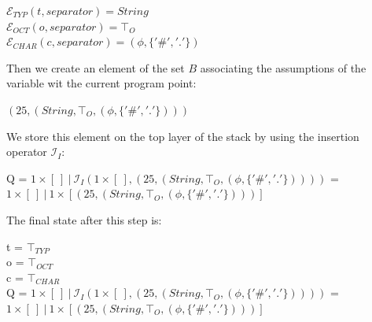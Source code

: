 \documentclass[10pt]{report}
\begin{document}
\begin{enumerate}
	\begin{center}
		$ \mathcal{E}_{TYP} (t, separator) = String $ \\
		$ \mathcal{E}_{OCT} (o, separator) = \top_{O} $ \\
		$ \mathcal{E}_{CHAR}(c, separator) = (\phi, \lbrace '\#', '.' \rbrace) $
	\end{center}
	Then we create an element of the set $ B $ associating the assumptions of the variable wit the current program point:
	\begin{center}
		$ (25, (String, \top_{O}, (\phi, \lbrace '\#', '.' \rbrace))) $
	\end{center}
	We store this element on the top layer of the stack by using the insertion operator $ \mathcal{I}_{I} $:
	\begin{center}
		Q = $ 1 \times [\ ]\ \vert\ \mathcal{I}_{I}(1 \times [\ ], (25, (String, \top_{O}, (\phi, \lbrace '\#', '.' \rbrace))))$ = \\
		$ 1 \times [\ ]\ \vert\ 1 \times [(25, (String, \top_{O}, (\phi, \lbrace '\#', '.' \rbrace)))]$\\
	\end{center}
	
	The final state after this step is: 
	\begin{center}
		t = $ \top_{TYP} $ \\
		o = $ \top_{OCT}$ \\
		c =  $ \top_{CHAR} $\\
		Q = $ 1 \times [\ ]\ \vert\ \mathcal{I}_{I}(1 \times [\ ], (25, (String, \top_{O}, (\phi, \lbrace '\#', '.' \rbrace))))$ = \\
		$ 1 \times [\ ]\ \vert\ 1 \times [(25, (String, \top_{O}, (\phi, \lbrace '\#', '.' \rbrace)))]$\\
	\end{center}
	

\end{enumerate}
\end{document}
